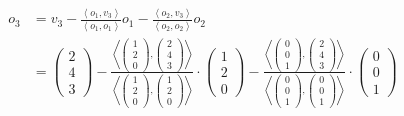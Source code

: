 \documentclass[german,12pt]{homework}
\newcommand{\dotproduct}[2]{\left\langle#1, #2\right\rangle}
\begin{document}
    \begin{align*}
        o_3 &= v_3 - \frac{\dotproduct{o_1}{v_3}}{\dotproduct{o_1}{o_1}}o_1 -
        \frac{\dotproduct{o_2}{v_3}}{\dotproduct{o_2}{o_2}}o_2\\
        &= \begin{pmatrix}2\\4\\3\end{pmatrix} -
        \frac{\dotproduct{\begin{pmatrix}1\\2\\0\end{pmatrix}}{\begin{pmatrix}2
        \\4\\3\end{pmatrix}}}{\dotproduct{\begin{pmatrix}1\\2\\0\end{pmatrix}}{
        \begin{pmatrix}1\\2\\0\end{pmatrix}}} \cdot
        \begin{pmatrix}1\\2\\0\end{pmatrix} -
        \frac{\dotproduct{\begin{pmatrix}0\\0\\1\end{pmatrix}}{\begin{pmatrix}2
        \\4\\3\end{pmatrix}}}{\dotproduct{\begin{pmatrix}0\\0\\1\end{pmatrix}}{
        \begin{pmatrix}0\\0\\1\end{pmatrix}}} \cdot
        \begin{pmatrix}0\\0\\1\end{pmatrix}\\

\end{align*}
\end{document}
